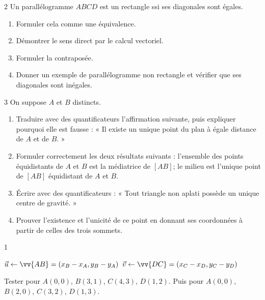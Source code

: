 \begin{exo}{2}
Un parall\'elogramme $ABCD$ est un rectangle ssi ses diagonales sont \'egales.
\begin{enumerate}
  \item Formuler cela comme une \'equivalence.
  \item D\'emontrer le sens direct par le calcul vectoriel.
  \item Formuler la contrapos\'ee.
  \item Donner un exemple de parall\'elogramme non rectangle et v\'erifier
        que ses diagonales sont in\'egales.
\end{enumerate}
\end{exo}

\begin{exo}{3}
On suppose $A$ et $B$ distincts.
\begin{enumerate}
  \item Traduire avec des quantificateurs l'affirmation suivante, puis expliquer
        pourquoi elle est fausse : « Il existe un unique point du plan à égale
        distance de $A$ et de $B$. »
  \item Formuler correctement les deux résultats suivants :
        l'ensemble des points équidistants de $A$ et $B$ est la médiatrice de
        $[AB]$; le milieu est l'unique point de $[AB]$ équidistant de $A$ et $B$.
  \item Écrire avec des quantificateurs : « Tout triangle non aplati possède un
        unique centre de gravité. »
  \item Prouver l'existence et l'unicité de ce point en donnant ses coordonnées
        à partir de celles des trois sommets.
\end{enumerate}
\end{exo}

\begin{exo}{1}

\begin{algorithm}[H]
\caption{Test de parall\'elogramme}
$\vec{u}\leftarrow\vv{AB}=(x_B-x_A,y_B-y_A)$\;
$\vec{v}\leftarrow\vv{DC}=(x_C-x_D,y_C-y_D)$\;
\end{algorithm}

Tester pour $A(0,0)$, $B(3,1)$, $C(4,3)$, $D(1,2)$.
Puis pour $A(0,0)$, $B(2,0)$, $C(3,2)$, $D(1,3)$.
\end{exo}

